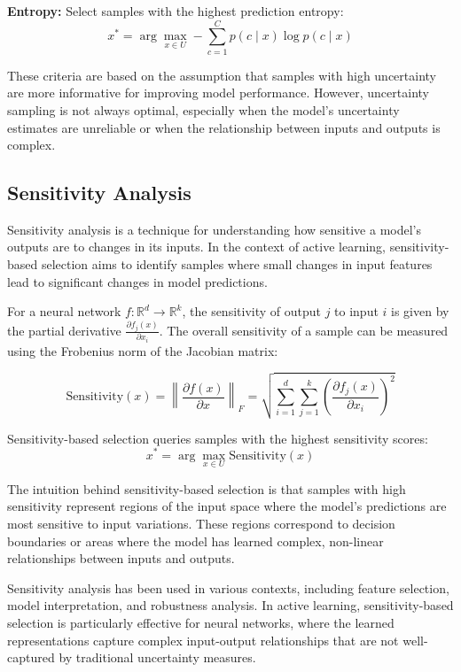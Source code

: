 \documentclass[conference]{IEEEtran}
\begin{document}
\textbf{Entropy:} Select samples with the highest prediction entropy:
\begin{equation}
x^* = \arg\max_{x \in U} -\sum_{c=1}^C p(c \mid x) \log p(c \mid x)
\end{equation}

These criteria are based on the assumption that samples with high uncertainty are more informative for improving model performance. However, uncertainty sampling is not always optimal, especially when the model's uncertainty estimates are unreliable or when the relationship between inputs and outputs is complex.

\subsection{Sensitivity Analysis}

Sensitivity analysis is a technique for understanding how sensitive a model's outputs are to changes in its inputs. In the context of active learning, sensitivity-based selection aims to identify samples where small changes in input features lead to significant changes in model predictions.

For a neural network $f: \mathbb{R}^d \rightarrow \mathbb{R}^k$, the sensitivity of output $j$ to input $i$ is given by the partial derivative $\frac{\partial f_j(x)}{\partial x_i}$. The overall sensitivity of a sample can be measured using the Frobenius norm of the Jacobian matrix:

\begin{equation}
\text{Sensitivity}(x) = \left\|\frac{\partial f(x)}{\partial x}\right\|_F = \sqrt{\sum_{i=1}^d \sum_{j=1}^k \left(\frac{\partial f_j(x)}{\partial x_i}\right)^2}
\end{equation}

Sensitivity-based selection queries samples with the highest sensitivity scores:
\begin{equation}
x^* = \arg\max_{x \in U} \text{Sensitivity}(x)
\end{equation}

The intuition behind sensitivity-based selection is that samples with high sensitivity represent regions of the input space where the model's predictions are most sensitive to input variations. These regions correspond to decision boundaries or areas where the model has learned complex, non-linear relationships between inputs and outputs.

Sensitivity analysis has been used in various contexts, including feature selection, model interpretation, and robustness analysis. In active learning, sensitivity-based selection is particularly effective for neural networks, where the learned representations capture complex input-output relationships that are not well-captured by traditional uncertainty measures.
\end{document}
